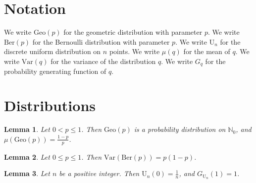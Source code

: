 \documentclass{article}
\newtheorem{lemma}{Lemma}
\begin{document}
\section{Notation}

We write $\mathrm{Geo}(p)$ for the geometric distribution with parameter $p$.
We write $\mathrm{Ber}(p)$ for the Bernoulli distribution with parameter $p$.
We write $\mathrm{U}_n$ for the discrete uniform distribution on $n$ points.
We write $\mu(q)$ for the mean of $q$.
We write $\mathrm{Var}(q)$ for the variance of the distribution $q$.
We write $G_q$ for the probability generating function of $q$.

\section{Distributions}

\begin{lemma}\label{geometric}
Let $0<p\le1$. Then $\mathrm{Geo}(p)$ is a probability distribution on $\mathbb N_0$, and $\mu(\mathrm{Geo}(p))=\frac{1-p}{p}$.
\end{lemma}

\begin{lemma}\label{bernoulli}
Let $0\le p\le1$. Then $\mathrm{Var}(\mathrm{Ber}(p))=p(1-p)$.
\end{lemma}

\begin{lemma}\label{uniform}
Let $n$ be a positive integer. Then $\mathrm{U}_n(0)=\frac1n$, and $G_{\mathrm{U}_n}(1)=1$.
\end{lemma}
\end{document}
